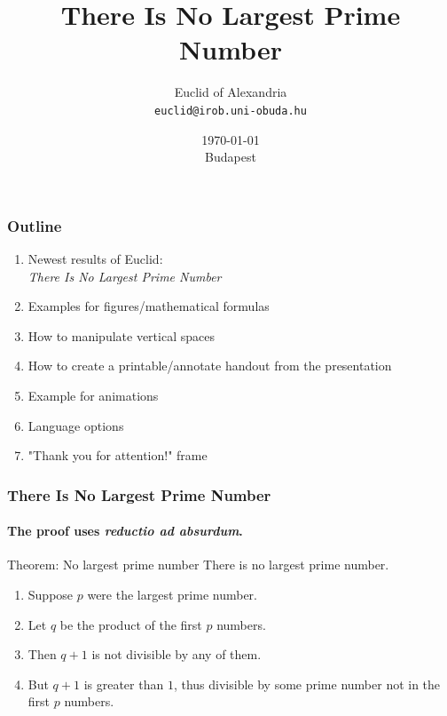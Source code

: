 \documentclass{beamer}
\title[No Largest Prime Number]{There Is No Largest Prime Number} %
\date{\today \\ Budapest} %
\author[Euclid]{Euclid of Alexandria \\ \texttt{euclid@irob.uni-obuda.hu}  } %
\begin{document}
	
	\begin{frame}
		\titlepage
	\end{frame}
	
	\begin{frame}
		\frametitle{Outline}
		
		\begin{enumerate}
			\item Newest results of Euclid: \\	\textit{There Is No Largest Prime Number}
				
				\vspace{3mm}
				
			\item Examples for figures/mathematical formulas
			
				\vspace{3mm}
				
			\item How to manipulate vertical spaces
			
				\vspace{3mm}
			
			\item How to create a printable/annotate handout from the presentation
			
				\vspace{3mm}
			
			\item Example for animations
			
				\vspace{3mm}
				
			\item Language options
			
				\vspace{3mm}
			
			\item "Thank you for attention!" frame
		\end{enumerate}
	\end{frame}
	
	\begin{frame} 
		\frametitle{There Is No Largest Prime Number} 
		\framesubtitle{The proof uses \textit{reductio ad absurdum}.} 
		\begin{block}{Theorem: No largest prime number}
			There is no largest prime number. 
		\end{block} 
		\begin{enumerate} 
			\item<1-| alert@1> Suppose $p$ were the largest prime number. 
			\item<2-> Let $q$ be the product of the first $p$ numbers. 
			\item<3-> Then $q+1$ is not divisible by any of them. 
			\item<4-> But $q + 1$ is greater than $1$, thus divisible by some prime
			number not in the first $p$ numbers.
		\end{enumerate}
	\end{frame}
	
\end{document}
